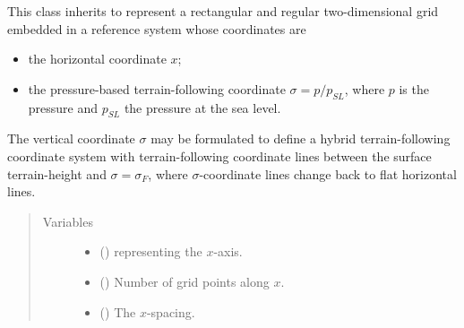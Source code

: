 \documentclass[letterpaper,10pt,english]{sphinxmanual}
\begin{document}

\begin{fulllineitems}
\label{\detokenize{api:tasmania.grids.sigma.Sigma2d}}
This class inherits {\hyperref[\detokenize{api:tasmania.grids.grid_xz.GridXZ}]{}} to represent a rectangular and regular
two-dimensional grid embedded in a reference system whose coordinates are
\begin{itemize}
\item {} 
the horizontal coordinate \(x\);

\item {} 
the pressure-based terrain-following coordinate \(\sigma = p / p_{SL}\),                  where \(p\) is the pressure and \(p_{SL}\) the pressure at the sea level.

\end{itemize}

The vertical coordinate \(\sigma\) may be formulated to define a hybrid terrain-following coordinate system
with terrain-following coordinate lines between the surface terrain-height and \(\sigma = \sigma_F\), where
\(\sigma\)-coordinate lines change back to flat horizontal lines.
\begin{quote}\begin{description}
\item[{Variables}] \leavevmode\begin{itemize}
\item {} 
{\hyperref[\detokenize{api:tasmania.grids.grid_xyz.GridXYZ.x}]{}} () \textendash{} {\hyperref[\detokenize{api:tasmania.grids.axis.Axis}]{}} representing the \(x\)-axis.

\item {} 
{\hyperref[\detokenize{api:tasmania.grids.grid_xyz.GridXYZ.nx}]{}} () \textendash{} Number of grid points along \(x\).

\item {} 
{\hyperref[\detokenize{api:tasmania.grids.grid_xyz.GridXYZ.dx}]{}} () \textendash{} The \(x\)-spacing.


\end{itemize}
\end{description}
\end{quote}
\end{fulllineitems}
\end{document}
